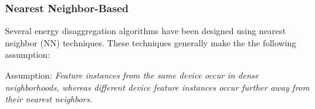 \iffalse
\textbf{Advantages and Disadvantages of Classification Based Techniques}

The \textit{advantages} of classification based techniques are as follows:
\begin{enumerate} 
\item Compared to unsupervised learning approaches, the disaggregation accuracy is higher 
when using the same dataset as input. 
\item Compared to unsupervised learning approaches, it requires less data set to build a disaggregation model. 
\item Compared to unsupervised learning approaches, once the model is trained, 
it has faster operation to obtain the output with input. 
\end{enumerate}

The \textit{disadvantages} of classification based techniques are: \manishc{I
  would think the main disadvantage of supervised methods is that labelled
  data is hard to get}\huijuanc{updated.}
\begin{enumerate}
\item The labelled data of each device is hard to get because the cost would be very high if installing meters to monitor each device. 
\end{enumerate}

\fi

\subsubsection{Nearest Neighbor-Based}
Several energy disaggregation algorithms have been designed using nearest neighbor (NN) techniques. These techniques generally make the the following assumption:

Assumption: \textit{Feature instances from the same device occur in dense neighborhoods, 
whereas different device feature instances occur further away from their nearest neighbors.}

